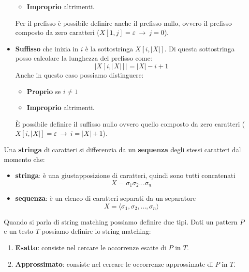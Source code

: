 \begin{definizione}
\begin{itemize}
\begin{itemize}
                  \item \textbf{Improprio} altrimenti.
              \end{itemize}
              Per il prefisso è possibile definire anche il prefisso nullo, ovvero il
              prefisso composto da zero caratteri ($X[1, j]=\varepsilon \ \to \ j = 0$).
        \item \textbf{Suffisso} che inizia in $i$ è la sottostringa $X[i,|X|]$.
              Di questa sottostringa posso calcolare la lunghezza del prefisso come:
              \begin{equation}
                  |X[i,|X|]| = |X| - i + 1
              \end{equation}
              Anche in questo caso possiamo distinguere:
              \begin{itemize}
                  \item \textbf{Proprio} se $i \neq 1$
                  \item \textbf{Improprio} altrimenti.
              \end{itemize}
              È possibile definire il suffisso nullo ovvero quello composto da zero
              caratteri ($X[i,|X|]=\varepsilon \ \to \ i = |X| + 1$).
    \end{itemize}
\end{definizione}
\begin{nota}
    Una \textbf{stringa} di caratteri si differenzia da un \textbf{sequenza}
    degli stessi caratteri dal momento che:
    \begin{itemize}
        \item \textbf{stringa}: è una giustapposizione di caratteri, quindi sono
              tutti concatenati
              \begin{equation}
                  X = \sigma_1\sigma_2\dots\sigma_n
              \end{equation}
        \item \textbf{sequenza}: è un elenco di caratteri separati da un separatore
              \begin{equation}
                  X= \langle\sigma_1,\sigma_2,\dots,\sigma_n\rangle
              \end{equation}
    \end{itemize}
\end{nota}
Quando si parla di string matching possiamo definire due tipi. Dati un pattern
$P$ e un testo $T$ possiamo definire lo string matching:
\begin{enumerate}
    \item \textbf{Esatto}: consiste nel cercare le occorrenze esatte di $P$ in $T$.
    \item \textbf{Approssimato}: consiste nel cercare le occorrenze approssimate
          di $P$ in $T$.
\end{enumerate}
